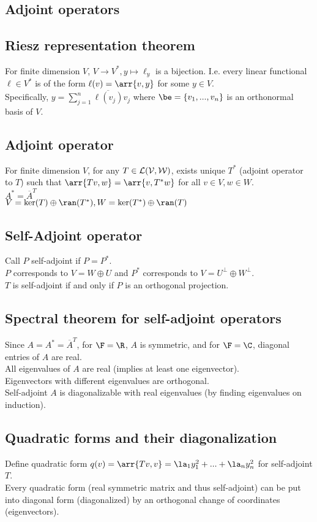 \documentclass[10pt]{LatexTemplate/hw}
\begin{document}
\begin{multicols*}{2}
\section{Adjoint operators}
\subsection{Riesz representation theorem}
For finite dimension $V$, $V\to V^*, y\mapsto \ell_y$ is a bijection. I.e. every linear functional $\ell\in V^*$ is of the form $\ell(v)=\arr{v,y}$ for some $y\in V$.\\
Specifically, $y=\sum_{j=1}^n\overline{\ell(v_j)}v_j$ where $\be=\{v_1,...,v_n\}$ is an orthonormal basis of $V$.
\subsection{Adjoint operator}
For finite dimension $V$, for any $T\in\cal{L}(V,W)$, exists unique $T^*$ (adjoint operator to $T$) such that $\arr{Tv,w}=\arr{v,T^*w}$ for all $v\in V,w\in W$.\\
$A^*=\overline{A}^T$\\
$V=\ker(T)\oplus\ran(T^*), W=\ker(T^*)\oplus\ran(T)$
\subsection{Self-Adjoint operator}
Call $P$ self-adjoint if $P=P^*$.\\
$P$ corresponds to $V=W\oplus U$ and $P^*$ corresponds to $V=U^\perp\oplus W^\perp$.\\
$T$ is self-adjoint if and only if $P$ is an orthogonal projection.

\subsection{Spectral theorem for self-adjoint operators}
Since $A=A^*=\overline{A}^T$, for $\F=\R$, $A$ is symmetric, and for $\F=\C$, diagonal entries of $A$ are real.\\
All eigenvalues of $A$ are real (implies at least one eigenvector).\\
Eigenvectors with different eigenvalues are orthogonal.\\
Self-adjoint $A$ is diagonalizable with real eigenvalues (by finding eigenvalues on induction).

\subsection{Quadratic forms and their diagonalization}
Define quadratic form $q(v)=\arr{Tv,v}=\la_1 y_1^2+...+\la_n y_n^2$ for self-adjoint $T$.\\
Every quadratic form (real symmetric matrix and thus self-adjoint) can be put into diagonal form (diagonalized) by an orthogonal change of coordinates (eigenvectors).


\end{multicols*}
\end{document}
